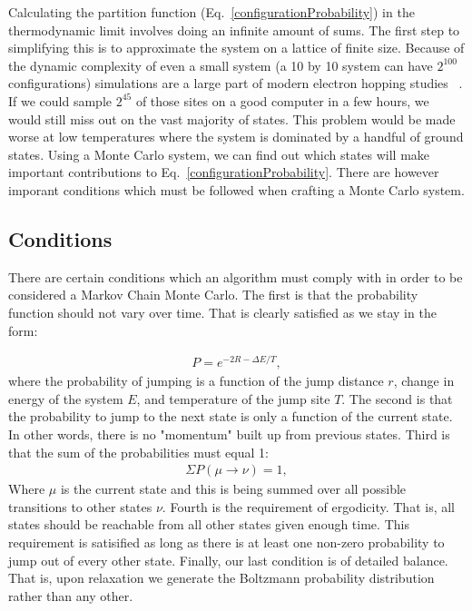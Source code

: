 	Calculating the partition function (Eq.~\ref{configurationProbability}) in the thermodynamic limit involves doing an infinite amount of sums. The first step to simplifying this is to approximate the system on a lattice of finite size. Because of the dynamic complexity of even a small system (a 10 by 10 system can have $2^{100}$ configurations) simulations are a large part of modern electron hopping studies ~\cite{kirkengen09}. If we could sample $2^{45}$ of those sites on a good computer in a few hours, we would still miss out on the vast majority of states. This problem would be made worse at low temperatures where the system is dominated by a handful of ground states. Using a Monte Carlo system, we can find out which states will make important contributions to Eq.~\ref{configurationProbability}. There are however imporant conditions which must be followed when crafting a Monte Carlo system.

\subsection{Conditions}
There are certain conditions which an algorithm must comply with in order to be considered a Markov Chain Monte Carlo. The first is that the probability function should not vary over time. That is clearly satisfied as we stay in the form:

\begin{eqnarray}
P = e^{-2R - \Delta E/T},
\label{simpleProb}
\end{eqnarray}
where the probability of jumping is a function of the jump distance $r$, change in energy of the system $E$, and temperature of the jump site $T$. The second is that the probability to jump to the next state is only a function of the current state. In other words, there is no "momentum" built up from previous states. Third is that the sum of the probabilities must equal 1:
\begin{eqnarray}
\Sigma P(\mu \rightarrow \nu) = 1 ,
\label{normalized}
\end{eqnarray}
Where $\mu$ is the current state and this is being summed over all possible transitions to other states $\nu$. Fourth is the requirement of ergodicity. That is, all states should be reachable from all other states given enough time. This requirement is satisified as long as there is at least one non-zero probability to jump out of every other state. Finally, our last condition is of detailed balance. That is, upon relaxation we generate the Boltzmann probability distribution rather than any other.

